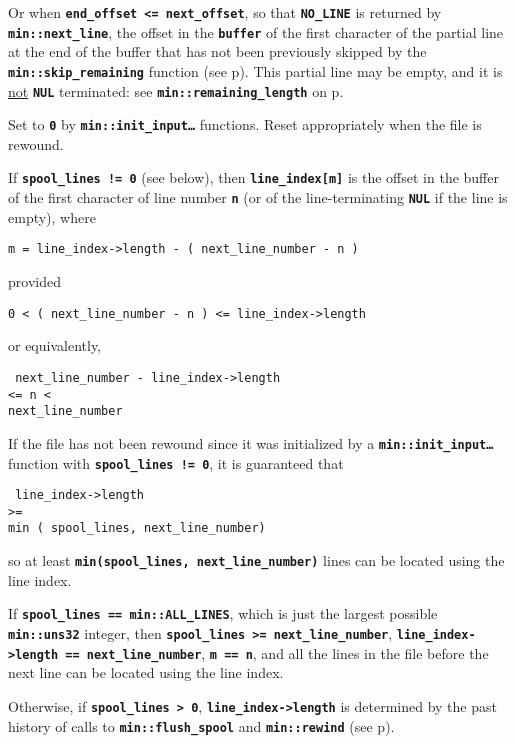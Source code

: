 \documentclass[12pt]{article}
\makeatletter
\newcommand{\TT}[1]{{\tt \bfseries #1}}
\newcommand{\ttmkey}[2]{\TT{#1}\index{#1@{\tt #1}!#2}}
\newcommand{\pagref}[1]{p\pageref{#1}}
\newcommand{\EOL}{\penalty \exhyphenpenalty}
\newenvironment{itemlist}[1][1.2in]%
	{\begin{list}{}{\setlength{\labelwidth}{#1}%
		        \setlength{\leftmargin}{\labelwidth}%
		        \addtolength{\leftmargin}{+0.2in}%
		        \renewcommand{\makelabel}[1]{##1\hfill}}}%
	{\end{list}}
\makeatother
\begin{document}
\begin{itemlist}[1.4in]
Or when \TT{end\_offset <= next\_offset}, so that
\TT{NO\_\EOL LINE} is returned by \TT{min::\EOL next\_\EOL line},
the offset in the \TT{buffer} of the first character of the
partial line at the end of the buffer
that has not been previously skipped by
the \TT{min::\EOL skip\_\EOL remaining} function
(see \pagref{MIN::SKIP_REMAINING}).  This partial line may be
empty, and it is \underline{not} \TT{NUL} terminated:
see \TT{min::\EOL remaining\_\EOL length} on
\pagref{MIN::REMAINING_LENGTH}.

Set to \TT{0} by \TT{min::\EOL init\_\EOL input\ldots} functions.
Reset appropriately when the file is rewound.

\item[\ttmkey{line\_\EOL index}{in {\tt min::file}}]
If \TT{spool\_lines~!=~0} (see below), then
\TT{line\_index[m]} is the offset in the buffer of the first
character of line number \TT{n} (or of the line-terminating \TT{NUL}
if the line is empty), where
\begin{center}
{\tt m = line\_index->length - ( next\_line\_number - n )}
\end{center}
provided
\begin{center}
{\tt 0 < ( next\_line\_number - n ) <= line\_index->length}
\end{center}
or equivalently,
\begin{center}
\tt
next\_line\_number - line\_index->length \\
<= n < \\
next\_line\_number
\end{center}

If the file has not been rewound since it was initialized by
a \TT{min::\EOL init\_\EOL input\ldots} function with
\TT{spool\_lines~!=~0}, it is guaranteed that
\begin{center}
\tt
line\_index->length \\
>= \\
min ( spool\_lines, next\_line\_number)
\end{center}
so at least \TT{min(spool\_lines, next\_line\_number)}
lines can be located using the line index.

If \TT{spool\_lines~==~min::ALL\_LINES}, which is just the largest possible
\TT{min::uns32} integer, then \TT{spool\_lines >= next\_line\_number},
\TT{line\_\EOL index->\EOL length == next\_\EOL line\_\EOL number},
\TT{m~==~n}, and all the lines in the file before the next line can be located
using the line index.

Otherwise, if \TT{spool\_lines~>~0},
\TT{line\_\EOL index->\EOL length} is determined by
the past history of calls to \TT{min::\EOL flush\_\EOL spool} and
\TT{min::rewind} (see \pagref{LINE-INDEX-LENGTH}).


\end{itemlist}
\end{document}
